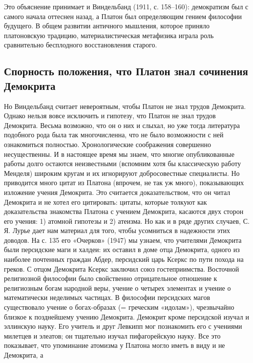 Это   объяснение  принимает   и  Виндельбанд   (1911,  с.   158--160):
демократизм  был  с  самого  начала   оттеснен  назад,  а  Платон  был
определяющим  гением философии  будущего. В  общем развитии  античного
мышления,  которое приняло  платоновскую традицию,  материалистическая
метафизика   играла  роль   сравнительно  бесплодного   восстановления
старого.

\subsection{Спорность положения, что Платон знал сочинения Демокрита}

Но  Виндельбанд  считает  невероятным,  чтобы Платон  не  знал  трудов
Демокрита. Однако  нельзя вовсе  исключить и  гипотезу, что  Платон не
знал трудов Демокрита. Весьма возможно, что  он о них и слыхал, но уже
тогда литература  подобного рода была  так многочисленна, что  не было
возможности с ней  ознакомиться полностью. Хронологические соображения
совершенно несущественны.  И в  настоящее время  мы знаем,  что многие
опубликованные  работы  долго  остаются  неизвестными  (вспомним  хотя
бы  классическую  работу  Менделя)  широким  кругам  и  их  игнорируют
добросовестные  специалисты.  Но  приводится много  цитат  из  Платона
(впрочем, не  так уж много), показывающих  изложение учения Демокрита.
Это считается доказательством,  что он читал Демокрита и  не хотел его
цитировать:  цитаты,  которые  толкуют как  доказательства  знакомства
Платона  с учением  Демокрита,  касаются двух  сторон  его учения:  1)
атомной гипотезы и 2)  атеизма. Но как и в ряде  других случаев, С. Я.
Лурье дает нам  материал для того, чтобы усомниться  в надежности этих
доводов.  На с.  135 его  «Очерков»  (1947) мы  узнаем, что  учителями
Демокрита  были персидские  маги  и  халдеи: их  оставил  в доме  отца
Демокрита, одного из наиболее почтенных граждан Абдер, персидский царь
Ксеркс по  пути похода  на греков. С  отцом Демокрита  Ксеркс заключил
союз гостеприимства. Восточной  религиозной философии было свойственно
отрицательное  отношение к  религиозным  богам  народной веры,  учение
о  четырех  элементах и  учение  о  математически неделимых  частицах.
В  философии  персидских  магов существовало  учение  о  богах-образах
(=  греческим  «идолам»),  чрезвычайно близкое  к  позднейшему  учению
Демокрита.  Демокрит кроме  персидской изучал  и эллинскую  науку. Его
учитель  и друг  Левкипп мог  познакомить  его с  учениями милетцев  и
элеатов; он тщательно изучал  пифагорейскую науку. Все это показывает,
что упоминание атомизма у Платона могло иметь в виду и не Демокрита, а
